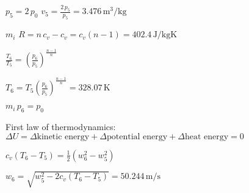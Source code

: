 \( p_5 = 2 \, p_0 \)  
\( v_5 = \frac{2 \, p_5}{p_5} = 3.476 \, \text{m}^3/\text{kg} \)  

\( m_i \)  
\( R = n \, c_v - c_v = c_v (n - 1) = 402.4 \, \text{J/kgK} \)  

\( \frac{T_6}{T_5} = \left( \frac{p_6}{p_5} \right)^{\frac{n-1}{n}} \)  

\( T_6 = T_5 \left( \frac{p_6}{p_5} \right)^{\frac{n-1}{n}} = 328.07 \, \text{K} \)  

\( m_i \, p_6 = p_0 \)  

First law of thermodynamics:  
\( \Delta U = \Delta \text{kinetic energy} + \Delta \text{potential energy} + \Delta \text{heat energy} = 0 \)  

\( c_v (T_6 - T_5) = \frac{1}{2} (w_6^2 - w_5^2) \)  

\( w_6 = \sqrt{w_5^2 - 2 c_v (T_6 - T_5)} = 50.244 \, \text{m/s} \)
